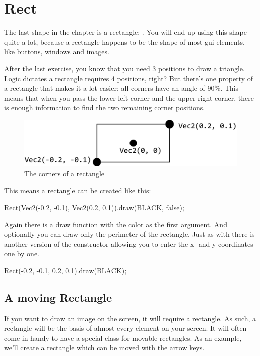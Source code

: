 \section{Rect}
The last shape in the chapter is a rectangle: . You will end up using this shape quite a lot, because a rectangle happens to be the shape of most gui elements, like buttons, windows and images.

After the last exercise, you know that you need 3 positions to draw a triangle. Logic dictates a rectangle requires 4 positions, right? But there's one property of a rectangle that makes it a lot easier: all corners have an angle of 90\%. This means that when you pass the lower left corner and the upper right corner, there is enough information to find the two remaining corner positions.

\begin{figure}[h]
\centering
\includegraphics[width=0.8\linewidth]{../images/rectangle}
\caption[]{The corners of a rectangle}
\label{fig:rect}
\end{figure}

This means a rectangle can be created like this:

\begin{code}
Rect(Vec2(-0.2, -0.1), Vec2(0.2, 0.1)).draw(BLACK, false);
\end{code}

Again there is a draw function with the color as the first argument. And optionally you can draw only the perimeter of the rectangle. Just as with  there is another version of the constructor allowing you to enter the x- and y-coordinates one by one.

\begin{code}
Rect(-0.2, -0.1, 0.2, 0.1).draw(BLACK);
\end{code}

\subsection{A moving Rectangle}
If you want to draw an image on the screen, it will require a rectangle. As such, a rectangle will be the basis of almost every element on your screen. It will often come in handy to have a special class for movable rectangles. As an example, we'll create a rectangle which can be moved with the arrow keys.

